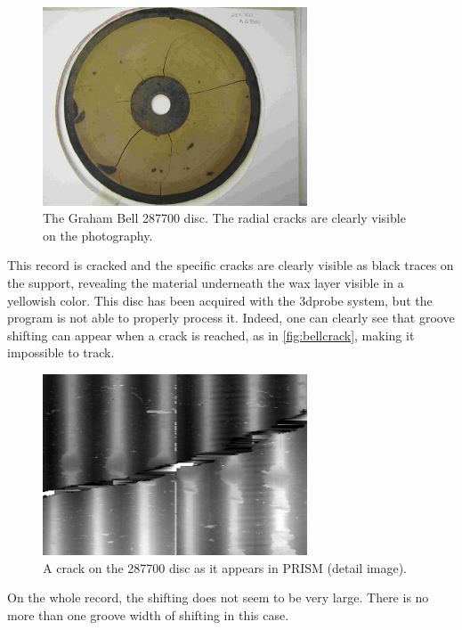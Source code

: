 \begin{figure}[!ht]
\centering
\includegraphics[width=0.7\textwidth]{images/bell-disc}
\caption[The Graham Bell 287700 disc.]{The Graham Bell 287700 disc. The radial cracks are clearly visible on the photography.}
\label{fig:belldisc}
\end{figure}

This record is cracked and the specific cracks are clearly visible as black traces on the support, revealing the material underneath the wax layer visible in a yellowish color. This disc has been acquired with the \gls{3dprobe} system, but the program is not able to properly process it. Indeed, one can clearly see that groove shifting can appear when a crack is reached, as in \autoref{fig:bellcrack}, making it impossible to track.

\begin{figure}[!ht]
\centering
\includegraphics[width=0.7\textwidth]{images/bell-crack}
\caption{A crack on the 287700 disc as it appears in PRISM (detail image).}
\label{fig:bellcrack}
\end{figure}

On the whole record, the shifting does not seem to be very large. There is no more than one groove width of shifting in this case.


